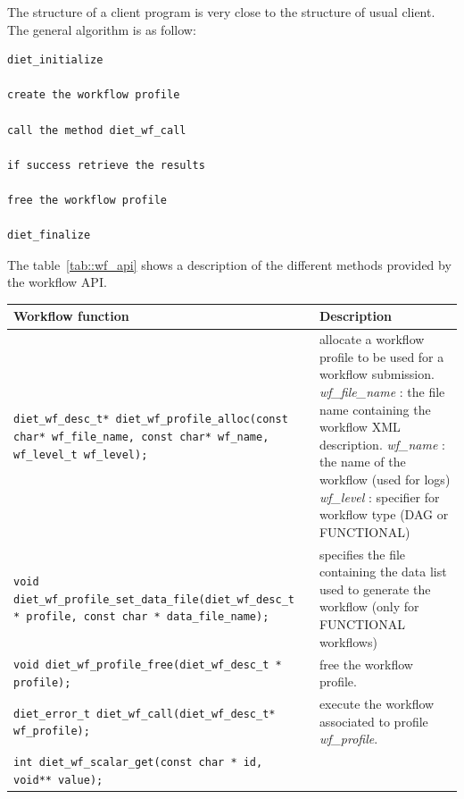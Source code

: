 The structure of a client program is very close to the structure of
usual \diet client. The general algorithm is as follow:

\begin{verbatim}
diet_initialize

create the workflow profile

call the method diet_wf_call

if success retrieve the results

free the workflow profile

diet_finalize
\end{verbatim}

The table~\ref{tab::wf_api} shows a description of the different
methods provided by the \diet workflow API.

\begin{table}[htbp]
  \centering
  \begin{tabular}[htbp]{|p{8cm}|p{7.5cm}|}\hline
    Workflow function & Description \\\hline
    \texttt{diet\_wf\_desc\_t*  \newline
      diet\_wf\_profile\_alloc(const char* wf\_file\_name, const char* wf\_name, wf\_level\_t wf\_level);}
    &
    allocate a workflow profile to be used for a workflow submission.\newline
    \textit{wf\_file\_name} : the file name containing the workflow XML description.
    \textit{wf\_name} : the name of the workflow (used for logs)
    \textit{wf\_level} : specifier for workflow type (DAG or FUNCTIONAL)
    \\\hline
    \texttt{void  \newline
      diet\_wf\_profile\_set\_data\_file(diet\_wf\_desc\_t * profile, const char * data\_file\_name);}
    &
    specifies the file containing the data list used to generate the workflow (only for FUNCTIONAL workflows)
    \\\hline
    \texttt{void  \newline
      diet\_wf\_profile\_free(diet\_wf\_desc\_t * profile);}
    &
    free the workflow profile.
    \\\hline
    \texttt{diet\_error\_t \newline
      diet\_wf\_call(diet\_wf\_desc\_t* wf\_profile);}
    &
    execute the workflow associated to profile \textit{wf\_profile}.
    \\\hline
    \texttt{int   \newline
      diet\_wf\_scalar\_get(const char * id, void** value);}

\end{tabular}
\end{table}

